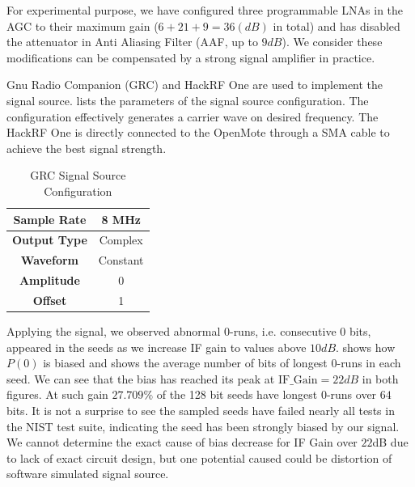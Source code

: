 For experimental purpose, we have configured three programmable LNAs in the AGC to their maximum gain ($6 + 21 + 9 = 36(dB)$ in total) and has disabled the attenuator in Anti Aliasing Filter (AAF, up to $9dB$). We consider these modifications can be compensated by a strong signal amplifier in practice.

Gnu Radio Companion (GRC)\cite{GRC} and HackRF One\cite{HackRFOne} are used to implement the signal source.  lists the parameters of the signal source configuration. The configuration effectively generates a carrier wave on desired frequency. The HackRF One is directly connected to the OpenMote through a SMA cable to achieve the best signal strength.

\begin{table}[!t]
\caption{GRC Signal Source Configuration}
\label{ConstantSignal}
\centering
\begin{tabular}{|c|c|}
\hline
\textbf{Sample Rate} & 8 MHz             \\ \hline
\textbf{Output Type} & Complex           \\ \hline
\textbf{Waveform}    & Constant \\ \hline
\textbf{Amplitude}   & 0                 \\ \hline
\textbf{Offset}      & 1                \\ \hline
\end{tabular}
\end{table}

Applying the signal, we observed abnormal 0-runs, i.e. consecutive $0$ bits, appeared in the seeds as we increase IF gain to values above $10dB$.  shows how $P(0)$ is biased and  shows the average number of bits of longest 0-runs in each seed. We can see that the bias has reached its peak at $\text{IF\_Gain} = 22dB$ in both figures. At such gain $27.709\%$ of the 128 bit seeds have longest 0-runs over $64$ bits. It is not a surprise to see the sampled seeds have failed nearly all tests in the NIST test suite, indicating the seed has been strongly biased by our signal. We cannot determine the exact cause of bias decrease for IF Gain over $22$dB due to lack of exact circuit design, but one potential caused could be distortion of software simulated signal source.

